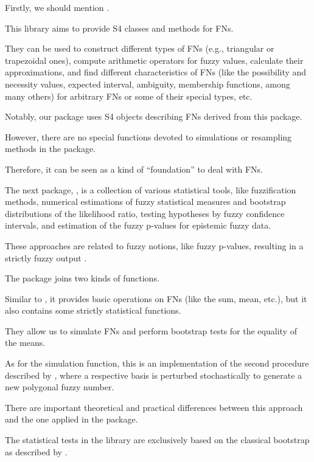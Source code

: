 Firstly, we should mention  \citep{FuzzyNumbersMan}.

This library aims to provide S4 classes and methods for FNs.

They can be used to construct different types of FNs (e.g., triangular or trapezoidal ones), compute arithmetic operators for fuzzy values, calculate their approximations, and find different characteristics of FNs (like the possibility and necessity values, expected interval, ambiguity, membership functions, among many others) for arbitrary FNs or some of their special types, etc.

Notably, our package  uses S4 objects describing FNs derived from this package.

However, there are no special functions devoted to simulations or resampling methods in the  package.

Therefore, it can be seen as a kind of ``foundation'' to deal with FNs.

The next package,  \citep{FuzzySTsMan}, is a collection of various statistical tools, like fuzzification methods, numerical estimations of fuzzy statistical measures and bootstrap distributions of the likelihood ratio, testing hypotheses by fuzzy confidence intervals, and estimation of the fuzzy p-values for epistemic fuzzy data.

These approaches are related to fuzzy notions, like fuzzy p-values, resulting in a strictly fuzzy output \citep{Berkachy2019}.

The  \citep{Trutschnig2013} package joins two kinds of functions.

Similar to , it provides basic operations on FNs (like the sum, mean, etc.), but it also contains some strictly statistical functions.

They allow us to simulate FNs and perform bootstrap tests for the equality of the means.

As for the simulation function, this is an implementation of the second procedure described by \cite{GONZALEZRODRIGUEZ2009642}, where a respective basis is perturbed stochastically to generate a new polygonal fuzzy number.

There are important theoretical and practical differences \citep{FRV} between this approach and the one applied in the  package.

The statistical tests in the  library are exclusively based on the classical bootstrap as described by \cite{COLUBI2009344,Montenegro2004}.

